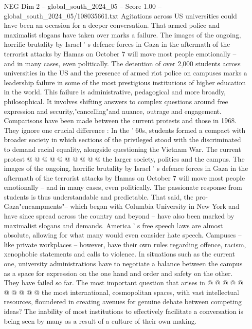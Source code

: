 \begin{textsample}{NEG Dim 2 – global\_south\_2024\_05 – Score 1.00 – global\_south\_2024\_05/108035661.txt}  \label{ex:f2_neg_215}
Agitations across US universities could have been an occasion for a deeper conversation.
That armed police and maximalist slogans have taken over marks a failure.
The images of the ongoing, horrific brutality by Israel ' s defence forces in Gaza in the aftermath of the terrorist attacks by Hamas on October 7 will move most people emotionally -- and in many cases, even politically.
The detention of over 2,000 students across universities in the US and the presence of armed riot police on campuses marks a leadership failure in some of the most prestigious institutions of higher education in the world.
This failure is administrative, pedagogical and more broadly, philosophical.
It involves shifting answers to complex questions around free expression and security,"cancelling"and nuance, outrage and engagement.
Comparisons have been made between the current protests and those in 1968.
They ignore one crucial difference : In the ' 60s, students formed a compact with broader society in which sections of the privileged stood with the discriminated to demand racial equality, alongside questioning the Vietnam War.
The current protest @ @ @ @ @ @ @ @ @ @ the larger society, politics and the campus.
The images of the ongoing, horrific brutality by Israel ' s defence forces in Gaza in the aftermath of the terrorist attacks by Hamas on October 7 will move most people emotionally -- and in many cases, even politically.
The passionate response from students is thus understandable and predictable.
That said, the pro-Gaza"encampments"-- which began with Columbia University in New York and have since spread across the country and beyond -- have also been marked by maximalist slogans and demands.
America ' s free speech laws are almost absolute, allowing for what many would even consider hate speech.
Campuses -- like private workplaces -- however, have their own rules regarding offence, racism, xenophobic statements and calls to violence.
In situations such as the current one, university administrations have to negotiate a balance between the campus as a space for expression on the one hand and order and safety on the other.
They have failed so far.
The most important question that arises in @ @ @ @ @ @ @ @ @ @ the most international, cosmopolitan spaces, with vast intellectual resources, floundered in creating avenues for genuine debate between competing ideas?
The inability of most institutions to effectively facilitate a conversation is being seen by many as a result of a culture of their own making.

\end{textsample}

